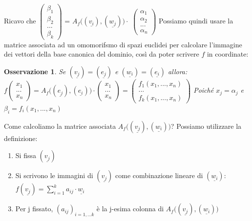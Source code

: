 \documentclass[12pt]{article}
\newenvironment{para}{\begin{adjustwidth}{13mm}{}}{\end{adjustwidth}}
\newtheorem{Osservazione}{Osservazione}[subsection]
\begin{document}
\begin{para}
Ricavo che $\begin{pmatrix}
    \beta_1 \\
    \beta_2 \\
    ...\\
    \beta_k
\end{pmatrix}$ = $A_f\bigl((\underline{v_i}), (\underline{w_j})\bigr) \cdot$ $\begin{pmatrix}
    \alpha_1 \\
    \alpha_2 \\
    ...\\
    \alpha_n
\end{pmatrix}$\newline
Possiamo quindi usare la matrice associata ad un omomorifsmo di spazi euclidei per calcolare l'immagine dei vettori della base canonica del dominio, così da poter scrivere $f$ in coordinate:
\begin{Osservazione}
    Se $(\underline{v_j}) = (\underline{e_j})$ e $(\underline{w_i}) = (\underline{e_i})$ allora: \newline $f\begin{pmatrix}
        x_1 \\
        ...\\
        x_n
    \end{pmatrix} = A_f\bigl((\underline{e_j}), (\underline{e_i})\bigr) \cdot \begin{pmatrix}
        x_1 \\
        ...\\
        x_n
    \end{pmatrix} = \begin{pmatrix}
        f_1(x_1, ..., x_n) \\
        ...\\
        f_k(x_1, ..., x_n)
    \end{pmatrix}$ \newline
Poiché $x_j = \alpha_j$ e $\beta_i = f_i(x_1, ..., x_n)$
\end{Osservazione}
Come calcoliamo la matrice associata $A_f\bigl((\underline{v_j}), (\underline{w_i})\bigr)$? Possiamo utilizzare la definizione:
\begin{enumerate}
    \item Si fissa $(\underline{v_j})$
    \item Si scrivono le immagini di $(\underline{v_j})$ come combinazione lineare di $(\underline{w_i})$:
    $f(\underline{v_j}) = \sum_{i=1}^k a_{ij} \cdot \underline{w_i}$
    \item Per j fissato, $(a_{ij})_{i = 1,...k}$ è la j-esima colonna di $A_f\bigl((\underline{v_j}), (\underline{w_i})\bigr)$

\end{enumerate}
\end{para}
\end{document}
